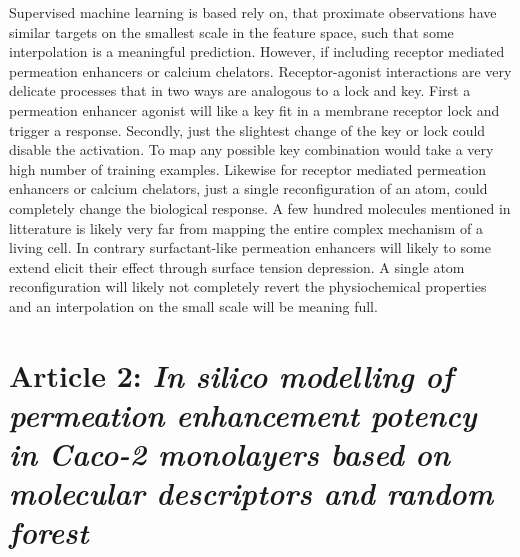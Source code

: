 Supervised machine learning is based rely on, that proximate observations have similar targets on the smallest scale in the feature space, such that some interpolation is a meaningful prediction. However, if including receptor mediated permeation enhancers or calcium chelators. Receptor-agonist interactions are very delicate processes that in two ways are analogous to a lock and key. First a permeation enhancer agonist will like a key fit in a membrane receptor lock and trigger a response. Secondly, just the slightest change of the key or lock could disable the activation. To map any possible key combination would take a very high number of training examples. Likewise for receptor mediated permeation enhancers or calcium chelators, just a single reconfiguration of an atom, could completely change the biological response. A few hundred molecules mentioned in litterature is likely very far from mapping the entire complex mechanism of a living cell. In contrary surfactant-like permeation enhancers will likely to some extend elicit their effect through surface tension depression. A single atom reconfiguration will likely not completely revert the physiochemical properties and an interpolation on the small scale will be meaning full.

\section{Article 2: \textit{In silico modelling of permeation enhancement potency in Caco-2 monolayers based on molecular descriptors and random forest}}
\label{article:predAbs}

\newpage




